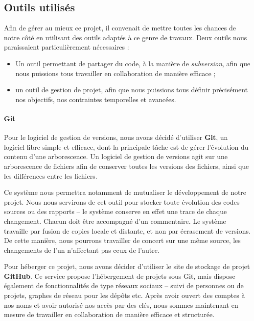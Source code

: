 \subsection{Outils utilisés}

Afin de gérer au mieux ce projet, il convenait de mettre toutes les chances de notre côté en utilisant des outils adaptés à ce genre de travaux. Deux outils nous paraissaient particulièrement nécessaires :
\begin{itemize}
  \item Un outil permettant de partager du code, à la manière de \textit{subversion}, afin que nous puissions tous travailler en collaboration de manière efficace ;
  \item un outil de gestion de projet, afin que nous puissions tous définir précisément nos objectifs, nos contraintes temporelles et avancées.
\end{itemize}

\paragraph*{Git\\}
\medskip Pour le logiciel de gestion de versions, nous avons décidé d'utiliser \textbf{Git}, un logiciel libre simple et efficace, dont la principale tâche est de gérer l'évolution du contenu d'une arborescence. Un logiciel de gestion de versions agit sur une arborescence de fichiers afin de conserver toutes les versions des fichiers, ainsi que les différences entre les fichiers.

Ce système nous permettra notamment de mutualiser le développement de notre projet. Nous nous servirons de cet outil pour stocker toute évolution des codes sources ou des rapports -- le système conserve en effet une trace de chaque changement. Chacun doit être accompagné d'un commentaire. Le système travaille par fusion de copies locale et distante, et non par écrasement de versions. De cette manière, nous pourrons travailler de concert sur une même source, les changements de l'un n'affectant pas ceux de l'autre.

Pour héberger ce projet, nous avons décider d'utiliser le site de stockage de projet \textbf{GitHub}. Ce service propose l'hébergement de projets sous Git, mais dispose également de fonctionnalités de type réseaux sociaux -- suivi de personnes ou de projets, graphes de réseau pour les dépôts etc. Après avoir ouvert des comptes à nos noms et avoir autorisé nos accès par des clés, nous sommes maintenant en mesure de travailler en collaboration de manière efficace et structurée.


